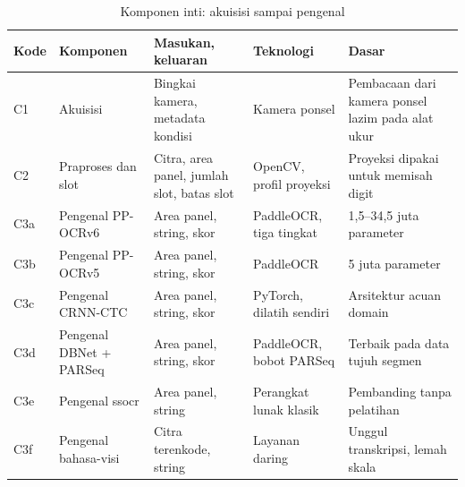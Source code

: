 \documentclass[12pt,a4paper,oneside]{report}
\newcommand{\parencite}[1]{\citep{#1}}
\begin{document}
\begin{table}[H]
\caption{Komponen inti: akuisisi sampai pengenal}
\label{tab:komponen}
\begin{tabularx}{\textwidth}{@{}L{0.9cm} L{2.9cm} L{3.4cm} L{2.6cm} X@{}}
\toprule
\textbf{Kode} & \textbf{Komponen} & \textbf{Masukan, keluaran} & \textbf{Teknologi} & \textbf{Dasar} \\
\midrule
C1 & Akuisisi & Bingkai kamera, metadata kondisi & Kamera ponsel & Pembacaan dari kamera ponsel lazim pada alat ukur \parencite{kulkarni2021cnn} \\
C2 & Praproses dan slot & Citra, area panel, jumlah slot, batas slot & OpenCV, profil proyeksi & Proyeksi dipakai untuk memisah digit \parencite{jiang2026method} \\
C3a & Pengenal PP-OCRv6 & Area panel, string, skor & PaddleOCR, tiga tingkat & 1,5--34,5 juta parameter \parencite{zhang2026ppocrv6} \\
C3b & Pengenal PP-OCRv5 & Area panel, string, skor & PaddleOCR & 5 juta parameter \parencite{zhang2026ppocrv5} \\
C3c & Pengenal CRNN-CTC & Area panel, string, skor & PyTorch, dilatih sendiri & Arsitektur acuan domain \parencite{shi2017crnn} \\
C3d & Pengenal DBNet + PARSeq & Area panel, string, skor & PaddleOCR, bobot PARSeq & Terbaik pada data tujuh segmen \parencite{low2024detecting, bautista2022parseq} \\
C3e & Pengenal ssocr & Area panel, string & Perangkat lunak klasik & Pembanding tanpa pelatihan \parencite{auerswal_ssocr} \\
C3f & Pengenal bahasa-visi & Citra terenkode, string & Layanan daring & Unggul transkripsi, lemah skala \parencite{ega2026leveraging, lin2026measurebench} \\
\bottomrule
\end{tabularx}
\end{table}
\end{document}
